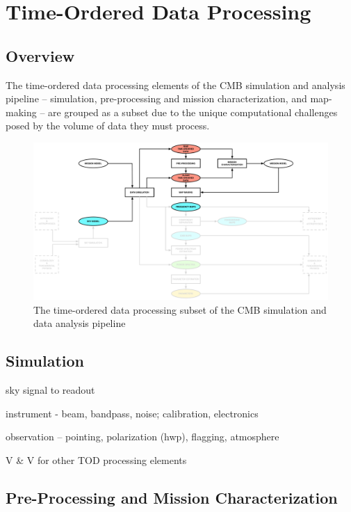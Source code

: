  
\section{Time-Ordered Data Processing}

\subsection{Overview}

The time-ordered data processing elements of the CMB simulation and analysis pipeline -- simulation, pre-processing and mission characterization, and map-making -- are grouped as a subset due to the unique computational challenges posed by the volume of data they must process.

\begin{figure}[htbp]
\centering
\includegraphics[width=1\textwidth]{Analysis/td}
\caption{The time-ordered data processing subset of the CMB simulation and data analysis pipeline}
\label{fig_td}
\end{figure}

\subsection{Simulation}

sky signal to readout

instrument - beam, bandpass, noise; calibration, electronics

observation -- pointing, polarization (hwp), flagging, atmosphere

V \& V for other TOD processing elements

\subsection{Pre-Processing and Mission Characterization}

